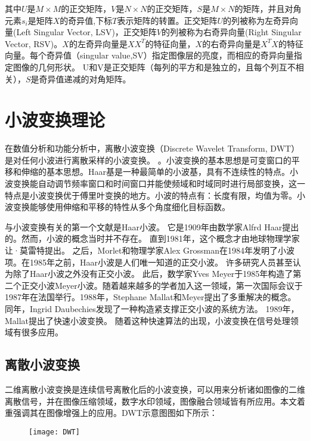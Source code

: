 其中$U$是$M×M$的正交矩阵，$V$是$N×N$的正交矩阵，$S$是$M×N$的矩阵，并且对角元素$s_i$是矩阵$X$的奇异值,下标$T$表示矩阵的转置。正交矩阵$U$的列被称为左奇异向量(Left Singular Vector, LSV)，正交矩阵$V$的列被称为右奇异向量(Right Singular Vector, RSV)。$X$的左奇异向量是$XX^T$的特征向量，$X$的右奇异向量是$X^TX$的特征向量。每个奇异值（singular value,SV）指定图像层的亮度，而相应的奇异向量指定图像的几何形状。 U和V是正交矩阵（每列的平方和是独立的，且每个列互不相关），$S$是奇异值递减的对角矩阵。%
		
		\section{小波变换理论}在数值分析和功能分析中，离散小波变换（Discrete Wavelet Transform, DWT）是对任何小波进行离散采样的小波变换。 。小波变换的基本思想是可变窗口的平移和伸缩的基本思想。Haar基是一种最简单的小波基，具有不连续性的特点。小波变换能自动调节频率窗口和时间窗口并能使频域和时域同时进行局部变换，这一特点是小波变换优于傅里叶变换的地方。小波的特点有：长度有限，均值为零。小波变换能够使用伸缩和平移的特性从多个角度细化目标函数。

与小波变换有关的第一个文献是Haar小波。 它是1909年由数学家Alfrd Haar提出的。然而，小波的概念当时并不存在。 直到1981年，这个概念才由地球物理学家让·莫雷特提出。 之后，Morlet和物理学家Alex Grossman在1984年发明了小波项。在1985年之前，Haar小波是人们唯一知道的正交小波。 许多研究人员甚至认为除了Haar小波之外没有正交小波。 此后，数学家Yves Meyer于1985年构造了第二个正交小波Meyer小波。随着越来越多的学者加入这一领域，第一次国际会议于1987年在法国举行。1988年，Stephane Mallat和Meyer提出了多重解决的概念。 同年，Ingrid Daubechies发现了一种构造紧支撑正交小波的系统方法。 1989年，Mallat提出了快速小波变换。 随着这种快速算法的出现，小波变换在信号处理领域有很多应用。
			\subsection{离散小波变换}二维离散小波变换是连续信号离散化后的小波变换，可以用来分析诸如图像的二维离散信号，并在图像压缩领域，数字水印领域，图像融合领域皆有所应用。本文着重强调其在图像增强上的应用。DWT示意图图如下所示：

\begin{figure}[!htbp]
    \centering
    \texttt{[image: DWT]}
    \label{fig:tc_q_criteria}
\end{figure}


